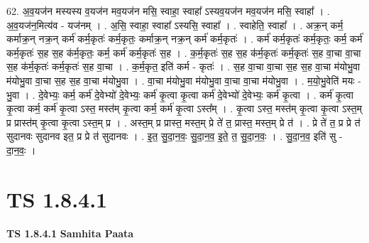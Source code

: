 \documentclass[17pt]{extarticle}
\begin{document}
62. अ॒व॒यज॑न मस्यस्य व॒यज॑न मव॒यज॑न मसि॒ स्वाहा॒ स्वाहा᳚ ऽस्यव॒यज॑न मव॒यज॑न मसि॒ स्वाहा᳚ । . अ॒व॒यज॑न॒मित्य॑व - यज॑नम् । . अ॒सि॒ स्वाहा॒ स्वाहा᳚ ऽस्यसि॒ स्वाहा᳚ । . स्वाहेति॒ स्वाहा᳚ । . अक्र॒न् कर्म॒ कर्माक्र॒न् नक्र॒न् कर्म॑ कर्म॒कृतः॑ कर्म॒कृतः॒ कर्माक्र॒न् नक्र॒न् कर्म॑ कर्म॒कृतः॑ । . कर्म॑ कर्म॒कृतः॑ कर्म॒कृतः॒ कर्म॒ कर्म॑ कर्म॒कृतः॑ स॒ह स॒ह क॑र्म॒कृतः॒ कर्म॒ कर्म॑ कर्म॒कृतः॑ स॒ह । . क॒र्म॒कृतः॑ स॒ह स॒ह क॑र्म॒कृतः॑ कर्म॒कृतः॑ स॒ह वा॒चा वा॒चा स॒ह क॑र्म॒कृतः॑ कर्म॒कृतः॑ स॒ह वा॒चा । . क॒र्म॒कृत॒ इति॑ कर्म - कृतः॑ । . स॒ह वा॒चा वा॒चा स॒ह स॒ह वा॒चा म॑योभु॒वा म॑योभु॒वा वा॒चा स॒ह स॒ह वा॒चा म॑योभु॒वा । . वा॒चा म॑योभु॒वा म॑योभु॒वा वा॒चा वा॒चा म॑योभु॒वा । . म॒यो॒भु॒वेति॑ मयः - भु॒वा । . दे॒वेभ्यः॒ कर्म॒ कर्म॑ दे॒वेभ्यो॑ दे॒वेभ्यः॒ कर्म॑ कृ॒त्वा कृ॒त्वा कर्म॑ दे॒वेभ्यो॑ दे॒वेभ्यः॒ कर्म॑ कृ॒त्वा । . कर्म॑ कृ॒त्वा कृ॒त्वा कर्म॒ कर्म॑ कृ॒त्वा ऽस्त॒ मस्त॑म् कृ॒त्वा कर्म॒ कर्म॑ कृ॒त्वा ऽस्त᳚म् । . कृ॒त्वा ऽस्त॒ मस्त॑म् कृ॒त्वा कृ॒त्वा ऽस्त॒म् प्र प्रास्त॑म् कृ॒त्वा कृ॒त्वा ऽस्त॒म् प्र । . अस्त॒म् प्र प्रास्त॒ मस्त॒म् प्रे ते॑ त॒ प्रास्त॒ मस्त॒म् प्रे त॑ । . प्रे ते॑ त॒ प्र प्रे त॑ सुदानवः सुदानव इत॒ प्र प्रे त॑ सुदानवः । . इ॒त॒ सु॒दा॒न॒वः॒ सु॒दा॒न॒व॒ इ॒ते॒ त॒ सु॒दा॒न॒वः॒ । . सु॒दा॒न॒व॒ इति॑ सु - दा॒न॒वः॒ । \newline
\pagebreak
{}

\section{ TS 1.8.4.1 }

\textbf{TS 1.8.4.1 } \newline
\textbf{Samhita Paata} \newline
\end{document}

